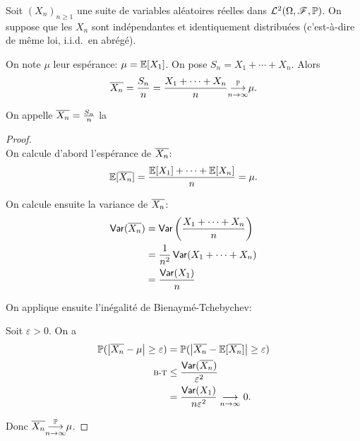 \begin{proposition}
    Soit \({(X_n)}_{n\geq 1}\) une suite de variables aléatoires
    réelles dans \(\mathcal L^2(\Omega, \mathscr{F}, \mathbb{P})\). On
    suppose que les \(X_n\) sont indépendantes et identiquement
    distribuées (c'est-à-dire de même loi, i.i.d.\ en abrégé).

    On note \(\mu\) leur espérance: \(\mu = \mathbb{E}[X_1]\). On
    pose \(S_n = X_1 + \cdots + X_n\). Alors
    \begin{equation*}
        \overline{X_n} = \frac{S_n}{n} = \frac{X_1 + \cdots + X_n}{n} \underset{n\to\infty}{{\overset{\mathbb{P}}{\longrightarrow}}} \mu.
    \end{equation*}

    On appelle \(\overline{X_n} = \frac{S_n}{n}\) la 
\end{proposition}

\begin{proof}\,\\
    \ptr{} On calcule d'abord l'espérance de \(\overline{X_n}\):
    \begin{equation*}
        \mathbb{E}[\overline{X_n}] = \frac{\mathbb{E}[X_1] + \cdots + \mathbb{E}[X_n]}{n} = \mu.
    \end{equation*}

    \ptr{} On calcule ensuite la variance de \(\overline{X_n}\):
    \begin{equation*}
        \begin{aligned}
            \operatorname{\mathsf{Var}}(\overline{X_n})
            &= \operatorname{\mathsf{Var}}\left(\frac{X_1 + \cdots + X_n}{n}\right)\\
            &= \frac{1}{n^2} \operatorname{\mathsf{Var}}(X_1 + \cdots + X_n)\\
            &= \frac{\operatorname{\mathsf{Var}}(X_1)}{n}\\
        \end{aligned}
    \end{equation*}

    \ptr{} On applique ensuite l'inégalité de Bienaymé-Tchebychev:

    Soit \(\varepsilon > 0\). On a
    \begin{equation*}
        \begin{aligned}
            \mathbb{P}(\mathopen{}\left|\overline{X_n} - \mu\right|\mathclose{} \geq \varepsilon)
            &= \mathbb{P}(\mathopen{}\left|\overline{X_n} - \mathbb{E}[\overline{X_n}]\right|\mathclose{} \geq \varepsilon)\\
            \text{\scriptsize{B-T}}&\leq \frac{\operatorname{\mathsf{Var}}(\overline{X_n})}{\varepsilon^2}\\
            &= \frac{\operatorname{\mathsf{Var}}(X_1)}{n\varepsilon^2} \underset{n\to\infty}{\longrightarrow} 0.
        \end{aligned}
    \end{equation*}

    Donc \(\overline{X_n} \underset{n\to\infty}{{\overset{\mathbb{P}}{\longrightarrow}}} \mu\).
\end{proof}

